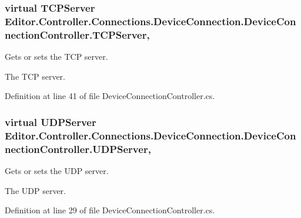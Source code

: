 \subsubsection[{T\-C\-P\-Server}]{\setlength{\rightskip}{0pt plus 5cm}virtual {\bf T\-C\-P\-Server} Editor.\-Controller.\-Connections.\-Device\-Connection.\-Device\-Connection\-Controller.\-T\-C\-P\-Server\hspace{0.3cm}{\ttfamily [get]}, {\ttfamily [set]}}\label{class_editor_1_1_controller_1_1_connections_1_1_device_connection_1_1_device_connection_controller_a5d39c82d739df7023c05aab4d4ab4593}


Gets or sets the T\-C\-P server. 

The T\-C\-P server. 

Definition at line 41 of file Device\-Connection\-Controller.\-cs.

\subsubsection[{U\-D\-P\-Server}]{\setlength{\rightskip}{0pt plus 5cm}virtual {\bf U\-D\-P\-Server} Editor.\-Controller.\-Connections.\-Device\-Connection.\-Device\-Connection\-Controller.\-U\-D\-P\-Server\hspace{0.3cm}{\ttfamily [get]}, {\ttfamily [set]}}\label{class_editor_1_1_controller_1_1_connections_1_1_device_connection_1_1_device_connection_controller_a7140b30e3c3b5b35896bb18f0f0da552}


Gets or sets the U\-D\-P server. 

The U\-D\-P server. 

Definition at line 29 of file Device\-Connection\-Controller.\-cs.


